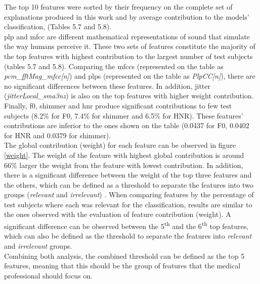 The top 10 features were sorted by their frequency on the complete set of explanations produced in this work and by average contribution to the models' classification, (Tables 5.7 and 5.8). \\
\gls{plp} and \gls{mfcc} are different mathematical representations of sound that simulate the way humans perceive it. These two sets of features constitute the majority of the top features with highest contribution to the largest number of test subjects (tables 5.7 and 5.8).
Comparing the \gls{mfcc}s (represented on the table as \textit{pcm\_fftMag\_mfcc[n]}) and \gls{plp}s (represented on the table as \textit{PlpCC[n]}), there are no significant differences between these features. In addition, jitter (\textit{jitterLocal\_sma3nz}) is also on the top features with higher weight contribution. Finally, \gls{f0}, shimmer and \gls{hnr} produce significant contributions to few test subjects (8.2\% for F0, 7.4\% for shimmer and 6.5\% for HNR). These features' contributions are inferior to the ones shown on the table (0.0437 for F0, 0.0402 for HNR and 0.0379 for shimmer). \\
The global contribution (weight) for each feature can be observed in figure \ref{weight}. The weight of the feature with highest global contribution is around 66\% larger the weight from the feature with lowest contribution. In addition, there is a significant difference between the weight of the top three features and the others, which can be defined as a threshold to separate the features into two groups (\textit{relevant} and \textit{irrelevant}) .
When comparing features by the percentage of test subjects where each was relevant for the classification, results are similar to the ones observed with the evaluation of feature contribution (weight). A significant difference can be observed between the 5\textsuperscript{th} and the 6\textsuperscript{th} top features, which can also be defined as the threshold to separate the features into \textit{relevant} and \textit{irrelevant} groups. \\
Combining both analysis, the combined threshold can be defined as the top 5 features, meaning that this should be the group of features that the medical professional should focus on.

